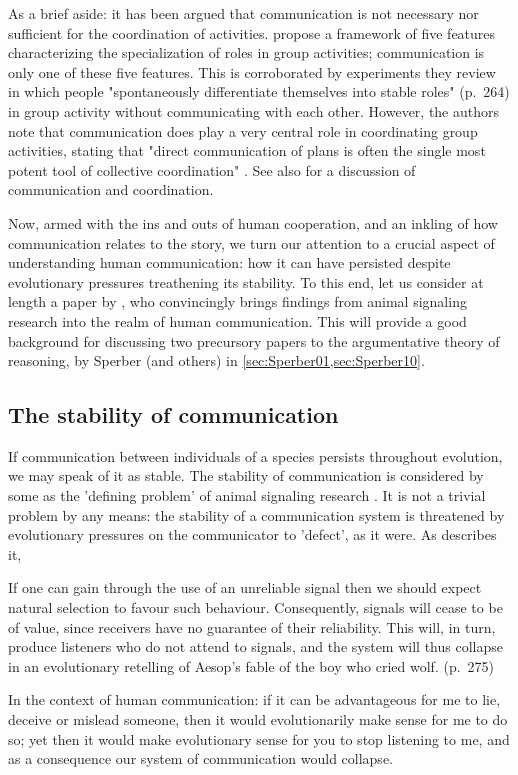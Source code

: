 As a brief aside: it has been argued that communication is not necessary nor sufficient for the coordination of activities. \citet{Goldstone24} propose a framework of five features characterizing the specialization of roles in group activities; communication is only one of these five features. This is corroborated by experiments they review in which people "spontaneously differentiate themselves into stable roles" (p.~264) in group activity without communicating with each other.
However, the authors note that communication does play a very central role in coordinating group activities, stating that "direct communication of plans is often the single most potent tool of collective coordination" \citep[p.~276]{Goldstone24}.
See also \citet{Vorobeychik17} for a discussion of communication and coordination.

Now, armed with the ins and outs of human cooperation, and an inkling of how communication relates to the story, we turn our attention to a crucial aspect of understanding human communication: how it can have persisted despite evolutionary pressures treathening its stability. To this end, let us consider at length a paper by \citet{Scott-Phillips08}, who convincingly brings findings from animal signaling research into the realm of human communication. This will provide a good background for discussing two precursory papers to the argumentative theory of reasoning, by Sperber (and others) in \cref{sec:Sperber01,sec:Sperber10}.

\subsection{The stability of communication}
\label{sec:S-P08}

If communication between individuals of a species persists throughout evolution, we may speak of it as stable. The stability of communication is considered by some as the 'defining problem' of animal signaling research \citep{Scott-Phillips08}. It is not a trivial problem by any means: the stability of a communication system is threatened by evolutionary pressures on the communicator to 'defect', as it were. As \citet{Scott-Phillips08} describes it,
\begin{quoting}
    If one can gain through the use of an unreliable
    signal then we should expect natural selection to favour such behaviour. Consequently, signals will cease to be of value, since receivers have no guarantee of their reliability. This will, in turn, produce listeners who do not attend to signals, and the system will thus collapse in an evolutionary retelling of Aesop’s fable of the boy who cried wolf.
    \hfill (p.~275)
\end{quoting}
In the context of human communication: if it can be advantageous for me to lie, deceive or mislead someone, then it would evolutionarily make sense for me to do so; yet then it would make evolutionary sense for you to stop listening to me, and as a consequence our system of communication would collapse.

